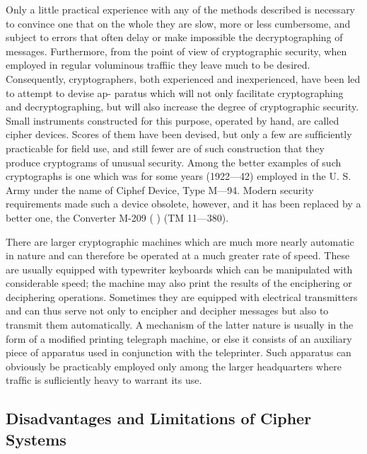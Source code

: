 \mypara Only a little practical experience with any of the methods described
is necessary to convince one that on the whole they are slow, more or less
cumbersome, and subject to errors that often delay or make impossible
the decryptographing of messages. Furthermore, from the point of view
of cryptographic security, when employed in regular voluminous traffiic
they leave much to be desired. Consequently, cryptographers, both experienced and inexperienced, have been led to attempt to devise ap-
paratus which will not only facilitate cryptographing and decryptographing, but will also increase the degree of cryptographic security. Small
instruments constructed for this purpose, operated by hand, are called
cipher devices. Scores of them have been devised, but only a few are
sufﬁciently practicable for ﬁeld use, and still fewer are of such construction that they produce cryptograms of unusual security. Among the
better examples of such cryptographs is one which was for some years
(1922—42) employed in the U. S. Army under the name of Ciphef
Device, Type M—94. Modern security requirements made such a device
obsolete, however, and it has been replaced by a better one, the Converter
M-209 ( ) (TM 11—380).

\mypara There are larger cryptographic machines which are much more
nearly automatic in nature and can therefore be operated at a much
greater rate of speed. These are usually equipped with typewriter keyboards which can be manipulated with considerable speed; the machine
may also print the results of the enciphering or deciphering operations.
Sometimes they are equipped with electrical transmitters and can thus
serve not only to encipher and decipher messages but also to transmit
them automatically. A mechanism of the latter nature is usually in the
form of a modiﬁed printing telegraph machine, or else it consists of an
auxiliary piece of apparatus used in conjunction with the teleprinter.
Such apparatus can obviously be practicably employed only among the
larger headquarters where trafﬁc is suﬂiciently heavy to warrant its use.

\subsection{Disadvantages and Limitations of Cipher Systems}

